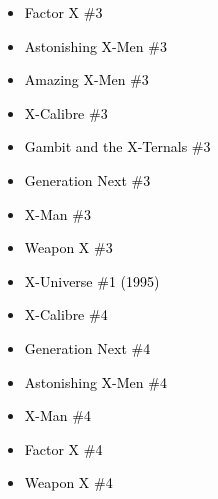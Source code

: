 \documentclass[12pt]{article}
\newcommand{\checkbox}{\raisebox{0.0ex}{\fbox{\rule{0ex}{1.5ex} \rule{1.5ex}{0ex}}}}
\begin{document}
\vspace{0.3cm}
\noindent
\begin{tcolorbox}[
  colback=white!95!gray,
  colframe=black,
  width=\textwidth,
  arc=4mm,
  auto outer arc,
  boxrule=0.8pt,
  left=8pt,right=8pt,top=8pt,bottom=8pt
]
\begin{itemize}[left=0pt,label={\checkbox}]
  \item \textcolor{black}{Factor X \#3}
  \item \textcolor{black}{Astonishing X-Men \#3}
  \item \textcolor{black}{Amazing X-Men \#3}
  \item \textcolor{black}{X-Calibre \#3}
  \item \textcolor{black}{Gambit and the X-Ternals \#3}
  \item \textcolor{black}{Generation Next \#3}
  \item \textcolor{black}{X-Man \#3}
  \item \textcolor{black}{Weapon X \#3}
  \item \textcolor{black}{X-Universe \#1 (1995)}
  \item \textcolor{black}{X-Calibre \#4}
  \item \textcolor{black}{Generation Next \#4}
  \item \textcolor{black}{Astonishing X-Men \#4}
  \item \textcolor{black}{X-Man \#4}
  \item \textcolor{black}{Factor X \#4}
  \item \textcolor{black}{Weapon X \#4}
\end{itemize}
\end{tcolorbox}

\newpage
{}
\end{document}
